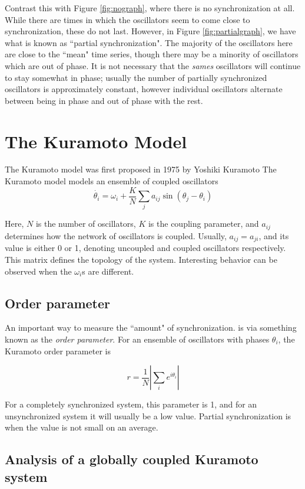 \documentclass[12pt]{article}
\begin{document}
Contrast this with Figure \ref{fig:nograph}, where there is no synchronization at all. While there are times in which the oscillators seem to come close to synchronization, these do not last. However, in Figure \ref{fig:partialgraph}, we have what is known as ``partial synchronization". The majority of the oscillators here are close to the ``mean" time
 series, though there may be a minority of oscillators which are out of phase. It is not necessary that the \emph{sames} oscillators will continue to stay somewhat in phase; usually the number of partially synchronized oscillators is approximately constant, however individual oscillators alternate between being in phase and out of phase with the rest.



\section{The Kuramoto Model}
The Kuramoto model was first proposed in 1975 by Yoshiki Kuramoto\cite{kuramoto1975proceedings}
The Kuramoto model models an ensemble of coupled oscillators
$$\dot{\theta_i} = \omega_i + \frac{K}{N}\sum_j a_{ij}\sin(\theta_j - \theta_i) $$

Here, $N$ is the number of oscillators, $K$ is the coupling parameter, and $a_{ij}$ determines how the network of oscillators is coupled. Usually, $a_{ij}=a_{ji}$, and its value is either 0 or 1, denoting uncoupled and coupled oscillators respectively. This matrix defines the topology of the system. Interesting behavior can be observed when the $\omega_i$s are different.

\subsection{Order parameter}
An important way to measure the ``amount" of synchronization. is via something known as the \emph{order parameter}. For an ensemble of oscillators with phases $\theta_i$, the Kuramoto order parameter is 

$$r = \frac1{N}\left|\sum_i e^{i\theta_i}\right|$$

For a completely synchronized system, this parameter is 1, and for an unsynchronized system it will usually be a low value. Partial synchronization is when the value is not small on an average.
\subsection{Analysis of a globally coupled Kuramoto system}
\end{document}
